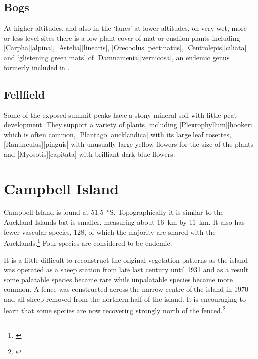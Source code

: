\subsection{Bogs}

At higher altitudes, and also in the `lanes' at lower altitudes, on very wet, more or less level sites there is a low plant cover of mat or cushion plants including [Carpha][alpina], [Astelia][linearis], [Oreobolus][pectinatus], [Centrolepis][ciliata] and `glistening green mats' of [Damnamenia][vernicosa], an endemic genus formerly included in .

\subsection{Fellfield}

Some of the exposed summit peaks have a stony mineral soil with little peat development.
They support a variety of plants, including [Pleurophyllum][hookeri] which is often common, [Plantago][aucklandica] with its large leaf rosettes, [Ranunculus][pinguis] with unusually large yellow flowers for the size of the plants and [Myosotis][capitata] with brilliant dark blue flowers.

\section{Campbell Island}

Campbell Island is found at \SI{51.5}{\degree}S.
Topographically it is similar to the Auckland Islands but is smaller, measuring about \SI{16}{\kilo\metre} by \SI{16}{\kilo\metre}.
It also has fewer vascular species, 128, of which the majority are shared with the Aucklands.\footnote{\cite{oliver1951botanical}}
Four species are considered to be endemic.

It is a little difficult to reconstruct the original vegetation patterns as the island was operated as a sheep station from late last century until 1931 and as a result some palatable species became rare while unpalatable species became more common.
A fence was constructed across the narrow centre of the island in 1970 and all sheep removed from the northern half of the island.
It is encouraging to learn that some species are now recovering strongly north of the fenced.\footnote{\cite{meurk1982regeneration}}

